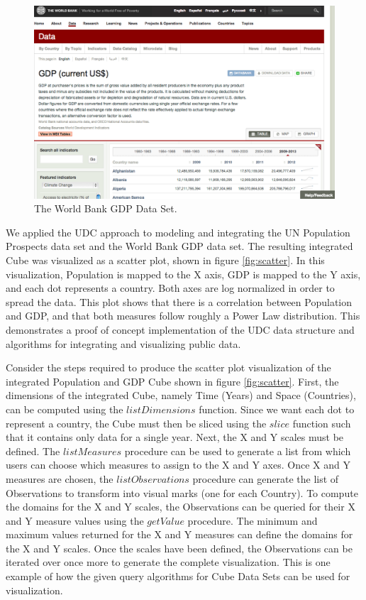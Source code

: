 \begin{figure}
  \centering
  \includegraphics[width=\figureWidth]{figs/worldBankGDP.png}
  \caption[World Bank GDP Data Set]{The World Bank GDP Data Set.}
  \label{fig:worldBankGDP}
\end{figure}

We applied the UDC approach to modeling and integrating the UN Population Prospects data set and the World Bank GDP data set. The resulting integrated Cube was visualized as a scatter plot, shown in figure \ref{fig:scatter}. In this visualization, Population is mapped to the X axis, GDP is mapped to the Y axis, and each dot represents a country. Both axes are log normalized in order to spread the data. This plot shows that there is a correlation between Population and GDP, and that both measures follow roughly a Power Law distribution. This demonstrates a proof of concept implementation of the UDC data structure and algorithms for integrating and visualizing public data.

Consider the steps required to produce the scatter plot visualization of the integrated Population and GDP Cube shown in figure \ref{fig:scatter}. First, the dimensions of the integrated Cube, namely Time (Years) and Space (Countries), can be computed using the $listDimensions$ function. Since we want each dot to represent a country, the Cube must then be sliced using the $slice$ function such that it contains only data for a single year. Next, the X and Y scales must be defined. The $listMeasures$ procedure can be used to generate a list from which users can choose which measures to assign to the X and Y axes. Once X and Y measures are chosen, the $listObservations$ procedure can generate the list of Observations to transform into visual marks (one for each Country). To compute the domains for the X and Y scales, the Observations can be queried for their X and Y measure values using the $getValue$ procedure. The minimum and maximum values returned for the X and Y measures can define the domains for the X and Y scales. Once the scales have been defined, the Observations can be iterated over once more to generate the complete visualization. This is one example of how the given query algorithms for Cube Data Sets can be used for visualization. 

